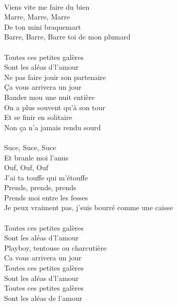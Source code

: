 \\Viens vite me faire du bien
\\Marre, Marre, Marre
\\De ton mini braquemart
\\Barre, Barre, Barre toi de mon plumard \bissimple
\\\\Toutes ces petites galères
\\Sont les aléas d'l'amour
\\Ne pas faire jouir son partenaire
\\Ça vous arrivera un jour
\\Bander mou une nuit entière
\\On a plus souvent qu'à son tour
\\Et se finir en solitaire
\\Non ça n'a jamais rendu sourd
\\\\Suce, Suce, Suce
\\Et branle moi l'anus
\\Ouf, Ouf, Ouf
\\J'ai ta touffe qui m'étouffe
\\Prends, prends, prends
\\Prends moi entre les fesses
\\Je peux vraiment pas, j'suis bourré comme une caisse \bissimple
\\\\Toutes ces petites galères
\\Sont les aléas d'l'amour
\\Playboy, tentouse ou charcutière
\\Ca vous arrivera un jour
\\Toutes ces petites galères
\\Sont les aléas d'l'amour
\\Toutes ces petites galères
\\Sont les aléas de l'amour

\breakpage